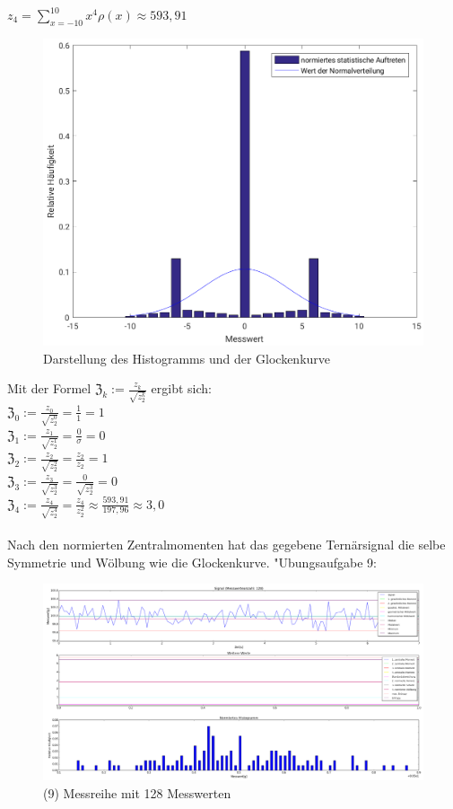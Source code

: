 \documentclass[fleqn,a4paper,12pt]{article}
\begin{document}
	$z_4 = \sum_{x=-10}^{10} x^4\rho(x) \approx  593,91$\\
	\newpage
	\begin{figure}
		\includegraphics[scale = 0.9]{A08_Histogramm.png}
		\caption{Darstellung des Histogramms und der Glockenkurve}
	\end{figure}
	Mit der Formel $\mathfrak{Z}_k := \frac{z_k}{\sqrt{z_2^k}}$ ergibt sich:\\
	$\mathfrak{Z}_0 := \frac{z_0}{\sqrt{z_2^0}} = \frac{1}{1} = 1$\\
	$\mathfrak{Z}_1 := \frac{z_1}{\sqrt{z_2^1}} = \frac{0}{\sigma} = 0$\\
	$\mathfrak{Z}_2 := \frac{z_2}{\sqrt{z_2^2}} = \frac{z_2}{z_2} = 1$\\
	$\mathfrak{Z}_3 := \frac{z_3}{\sqrt{z_2^3}} = \frac{0}{\sqrt{z_2^3}} = 0$\\
	$\mathfrak{Z}_4 := \frac{z_4}{\sqrt{z_2^4}} = \frac{z_4}{z_2^2} \approx \frac{593,91}{197,96} \approx 3,0$\\
	\\
	Nach den normierten Zentralmomenten hat das gegebene Ternärsignal die selbe Symmetrie und Wölbung wie die Glockenkurve.
  \newpage
  "Ubungsaufgabe 9: \newline
  \begin{figure}
      \includegraphics[width=1.0\textwidth]{A09_128.png}
      \caption{(9) Messreihe mit 128 Messwerten}
  \end{figure}
\end{document}
